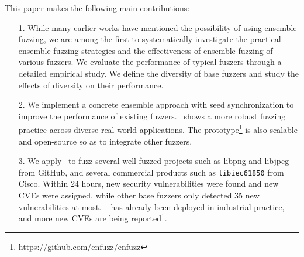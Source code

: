 This paper makes the following main contributions:
\vspace{0.03in}
\begin{itemize}

	 \item [1.] While many earlier works have mentioned the possibility of using ensemble fuzzing, we are among the first to systematically investigate the practical ensemble fuzzing strategies and the effectiveness of ensemble fuzzing of various fuzzers. We evaluate the performance of typical fuzzers through a detailed empirical study. %
	 We define the diversity of base fuzzers and study the effects of diversity on their performance. %

	 \item [2.] We implement a concrete ensemble approach with seed synchronization to improve the performance of existing fuzzers. \EnFuzz ~shows a more robust fuzzing practice across diverse real world applications. The prototype\footnote{\url{https://github.com/enfuzz/enfuzz}\label{footnote1}} is also scalable and open-source so as to integrate other fuzzers. %

	 
	 \item [3.] We apply \EnFuzz ~to fuzz several well-fuzzed projects such as libpng and libjpeg from GitHub, and several commercial products such as \texttt{libiec61850} from Cisco. Within 24 hours, \bugnum new security vulnerabilities were found and \cvenum new CVEs were assigned, while other base fuzzers only detected 35 new vulnerabilities at most. \EnFuzz~ has already been deployed in industrial practice, and more new CVEs are being reported$^{1}$.
\end{itemize}

